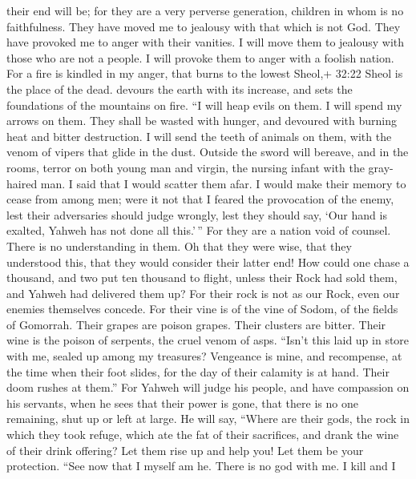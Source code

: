their end will be; for they are a very perverse generation, children in
whom is no faithfulness.  They have moved me to jealousy
with that which is not God. They have provoked me to anger with their
vanities. I will move them to jealousy with those who are not a people.
I will provoke them to anger with a foolish nation.  For a
fire is kindled in my anger, that burns to the lowest Sheol,+ 32:22
Sheol is the place of the dead. devours the earth with its increase, and
sets the foundations of the mountains on fire.  ``I will
heap evils on them. I will spend my arrows on them.  They
shall be wasted with hunger, and devoured with burning heat and bitter
destruction. I will send the teeth of animals on them, with the venom of
vipers that glide in the dust.  Outside the sword will
bereave, and in the rooms, terror on both young man and virgin, the
nursing infant with the gray-haired man.  I said that I
would scatter them afar. I would make their memory to cease from among
men;  were it not that I feared the provocation of the
enemy, lest their adversaries should judge wrongly, lest they should
say, `Our hand is exalted, Yahweh has not done all this.'\,''
 For they are a nation void of counsel. There is no
understanding in them.  Oh that they were wise, that they
understood this, that they would consider their latter end!
 How could one chase a thousand, and two put ten thousand
to flight, unless their Rock had sold them, and Yahweh had delivered
them up?  For their rock is not as our Rock, even our
enemies themselves concede.  For their vine is of the vine
of Sodom, of the fields of Gomorrah. Their grapes are poison grapes.
Their clusters are bitter.  Their wine is the poison of
serpents, the cruel venom of asps.  ``Isn't this laid up in
store with me, sealed up among my treasures?  Vengeance is
mine, and recompense, at the time when their foot slides, for the day of
their calamity is at hand. Their doom rushes at them.'' 
For Yahweh will judge his people, and have compassion on his servants,
when he sees that their power is gone, that there is no one remaining,
shut up or left at large.  He will say, ``Where are their
gods, the rock in which they took refuge,  which ate the
fat of their sacrifices, and drank the wine of their drink offering? Let
them rise up and help you! Let them be your protection. 
``See now that I myself am he. There is no god with me. I kill and I
